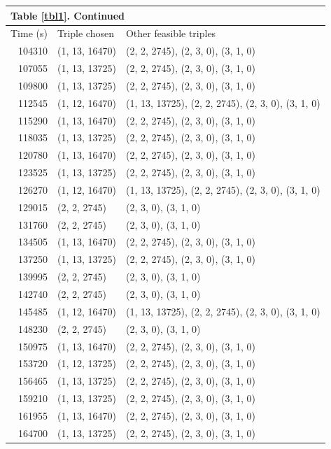 \documentclass[../main.tex]{subfiles}
\begin{document}
\begin{table}[h!t!]
\begin{tabularx}{6.5 in}{r l X}
\multicolumn{3}{l}{Table \ref{tbl1}. Continued}\\%
\hline {{Time (s)}} & {{Triple chosen}} & {{Other feasible triples}} \\ \hline
104310 & (1, 13, 16470) & (2, 2, 2745), (2, 3, 0), (3, 1, 0) \\
107055 & (1, 13, 13725) & (2, 2, 2745), (2, 3, 0), (3, 1, 0) \\
109800 & (1, 13, 13725) & (2, 2, 2745), (2, 3, 0), (3, 1, 0) \\
112545 & (1, 12, 16470) & (1, 13, 13725), (2, 2, 2745), (2, 3, 0), (3, 1, 0) \\
115290 & (1, 13, 16470) & (2, 2, 2745), (2, 3, 0), (3, 1, 0) \\
118035 & (1, 13, 13725) & (2, 2, 2745), (2, 3, 0), (3, 1, 0) \\
120780 & (1, 13, 16470) & (2, 2, 2745), (2, 3, 0), (3, 1, 0) \\
123525 & (1, 13, 13725) & (2, 2, 2745), (2, 3, 0), (3, 1, 0) \\
126270 & (1, 12, 16470) & (1, 13, 13725), (2, 2, 2745), (2, 3, 0), (3, 1, 0) \\
129015 & (2, 2, 2745) & (2, 3, 0), (3, 1, 0) \\
131760 & (2, 2, 2745) & (2, 3, 0), (3, 1, 0) \\
134505 & (1, 13, 16470) & (2, 2, 2745), (2, 3, 0), (3, 1, 0) \\
137250 & (1, 13, 13725) & (2, 2, 2745), (2, 3, 0), (3, 1, 0) \\
139995 & (2, 2, 2745) & (2, 3, 0), (3, 1, 0) \\
142740 & (2, 2, 2745) & (2, 3, 0), (3, 1, 0) \\
145485 & (1, 12, 16470) & (1, 13, 13725), (2, 2, 2745), (2, 3, 0), (3, 1, 0)\\%
148230 & (2, 2, 2745) & (2, 3, 0), (3, 1, 0) \\
150975 & (1, 13, 16470) & (2, 2, 2745), (2, 3, 0), (3, 1, 0) \\
153720 & (1, 12, 13725) & (2, 2, 2745), (2, 3, 0), (3, 1, 0) \\
156465 & (1, 13, 13725) & (2, 2, 2745), (2, 3, 0), (3, 1, 0) \\
159210 & (1, 13, 13725) & (2, 2, 2745), (2, 3, 0), (3, 1, 0) \\
161955 & (1, 13, 16470) & (2, 2, 2745), (2, 3, 0), (3, 1, 0) \\
164700 & (1, 13, 13725) & (2, 2, 2745), (2, 3, 0), (3, 1, 0) \\

\end{tabularx}
\end{table}
\end{document}
